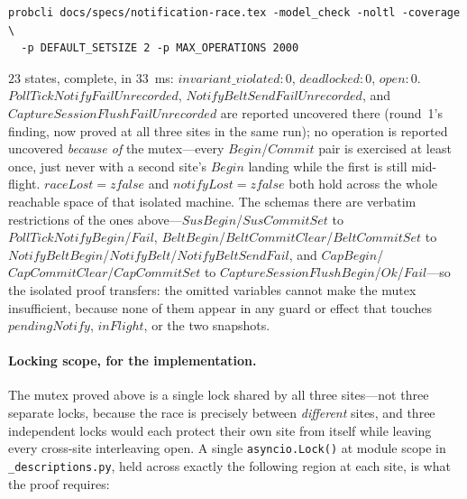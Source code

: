\documentclass[a4paper,10pt,fleqn]{article}
\begin{document}
\begin{verbatim}
probcli docs/specs/notification-race.tex -model_check -noltl -coverage \
  -p DEFAULT_SETSIZE 2 -p MAX_OPERATIONS 2000
\end{verbatim}

$23$ states, complete, in $33$~ms: $invariant\_violated{:}0$,
$deadlocked{:}0$, $open{:}0$.  $PollTickNotifyFailUnrecorded$,
$NotifyBeltSendFailUnrecorded$, and $CaptureSessionFlushFailUnrecorded$
are reported uncovered there (round~1's finding, now proved at all
three sites in the same run); no operation is reported uncovered
\emph{because of} the mutex---every $Begin$/$Commit$ pair is exercised
at least once, just never with a second site's $Begin$ landing while
the first is still mid-flight.  $raceLost = zfalse$ and $notifyLost =
zfalse$ both hold across the whole reachable space of that isolated
machine.  The schemas there are verbatim restrictions of the ones
above---$SusBegin$/$SusCommitSet$ to $PollTickNotifyBegin$/$Fail$,
$BeltBegin$/$BeltCommitClear$/$BeltCommitSet$ to
$NotifyBeltBegin$/$NotifyBelt$/$NotifyBeltSendFail$, and
$CapBegin$/$CapCommitClear$/$CapCommitSet$ to
$CaptureSessionFlushBegin$/$Ok$/$Fail$---so the isolated proof
transfers: the omitted variables cannot make the mutex insufficient,
because none of them appear in any guard or effect that touches
$pendingNotify$, $inFlight$, or the two snapshots.

\paragraph{Locking scope, for the implementation.}  The mutex proved
above is a single lock shared by all three sites---not three separate
locks, because the race is precisely between \emph{different} sites,
and three independent locks would each protect their own site from
itself while leaving every cross-site interleaving open.  A single
\texttt{asyncio.Lock()} at module scope in \texttt{\_descriptions.py},
held across exactly the following region at each site, is what the
proof requires:
\end{document}
